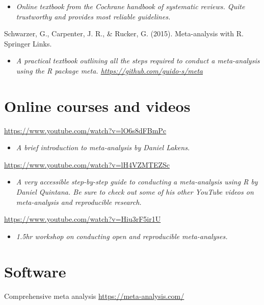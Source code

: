 \documentclass[
]{book}
\providecommand{\tightlist}{%
  \setlength{\itemsep}{0pt}\setlength{\parskip}{0pt}}
\begin{document}
\begin{itemize}
\tightlist
\item
  \emph{Online textbook from the Cochrane handbook of systematic reviews. Quite trustworthy and provides most reliable guidelines.}
\end{itemize}

Schwarzer, G., Carpenter, J. R., \& Rucker, G. (2015). Meta-analysis with R. Springer Links.

\begin{itemize}
\tightlist
\item
  \emph{A practical textbook outlining all the steps required to conduct a meta-analysis using the R package meta. \url{https://github.com/guido-s/meta} }
\end{itemize}

\section{Online courses and videos}\label{online-courses-and-videos-3}

\url{https://www.youtube.com/watch?v=lO6s8dFBmPc}

\begin{itemize}
\tightlist
\item
  \emph{A brief introduction to meta-analysis by Daniel Lakens.}
\end{itemize}

\url{https://www.youtube.com/watch?v=lH4VZMTEZSc}

\begin{itemize}
\tightlist
\item
  \emph{A very accessible step-by-step guide to conducting a meta-analysis using R by Daniel Quintana. Be sure to check out some of his other YouTube videos on meta-analysis and reproducible research. }
\end{itemize}

\url{https://www.youtube.com/watch?v=Hiu3rF5ir1U}

\begin{itemize}
\tightlist
\item
  \emph{1.5hr workshop on conducting open and reproducible meta-analyses.}
\end{itemize}

\section{Software}\label{software}

Comprehensive meta analysis \url{https://meta-analysis.com/}
\end{document}
